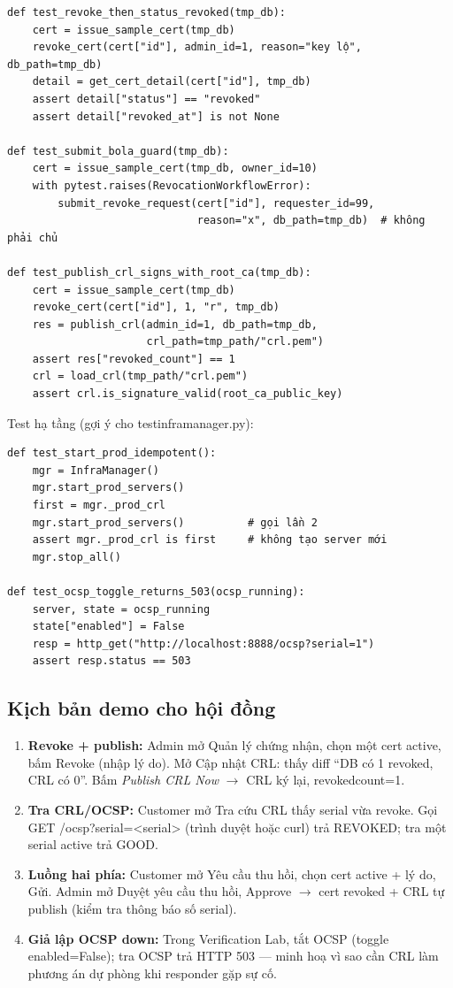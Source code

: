 \documentclass[12pt,a4paper]{article}
\newcommand{\code}[1]{{\ttfamily\small\def\_{\textunderscore\discretionary{}{}{}}#1}}
\begin{document}
\begin{Verbatim}
def test_revoke_then_status_revoked(tmp_db):
    cert = issue_sample_cert(tmp_db)
    revoke_cert(cert["id"], admin_id=1, reason="key lộ", db_path=tmp_db)
    detail = get_cert_detail(cert["id"], tmp_db)
    assert detail["status"] == "revoked"
    assert detail["revoked_at"] is not None

def test_submit_bola_guard(tmp_db):
    cert = issue_sample_cert(tmp_db, owner_id=10)
    with pytest.raises(RevocationWorkflowError):
        submit_revoke_request(cert["id"], requester_id=99,
                              reason="x", db_path=tmp_db)  # không phải chủ

def test_publish_crl_signs_with_root_ca(tmp_db):
    cert = issue_sample_cert(tmp_db)
    revoke_cert(cert["id"], 1, "r", tmp_db)
    res = publish_crl(admin_id=1, db_path=tmp_db,
                      crl_path=tmp_path/"crl.pem")
    assert res["revoked_count"] == 1
    crl = load_crl(tmp_path/"crl.pem")
    assert crl.is_signature_valid(root_ca_public_key)
\end{Verbatim}

Test hạ tầng (gợi ý cho \code{test\_infra\_manager.py}):

\begin{Verbatim}
def test_start_prod_idempotent():
    mgr = InfraManager()
    mgr.start_prod_servers()
    first = mgr._prod_crl
    mgr.start_prod_servers()          # gọi lần 2
    assert mgr._prod_crl is first     # không tạo server mới
    mgr.stop_all()

def test_ocsp_toggle_returns_503(ocsp_running):
    server, state = ocsp_running
    state["enabled"] = False
    resp = http_get("http://localhost:8888/ocsp?serial=1")
    assert resp.status == 503
\end{Verbatim}

\subsection{Kịch bản demo cho hội đồng}

\begin{enumerate}
  \item \textbf{Revoke + publish:} Admin mở Quản lý chứng nhận, chọn một cert
    active, bấm Revoke (nhập lý do). Mở Cập nhật CRL: thấy diff ``DB có 1
    revoked, CRL có 0''. Bấm \emph{Publish CRL Now} $\to$ CRL ký lại,
    \code{revoked\_count}=1.
  \item \textbf{Tra CRL/OCSP:} Customer mở Tra cứu CRL thấy serial vừa revoke.
    Gọi \code{GET /ocsp?serial=<serial>} (trình duyệt hoặc curl) trả
    \code{REVOKED}; tra một serial active trả \code{GOOD}.
  \item \textbf{Luồng hai phía:} Customer mở Yêu cầu thu hồi, chọn cert active +
    lý do, Gửi. Admin mở Duyệt yêu cầu thu hồi, Approve $\to$ cert revoked + CRL
    tự publish (kiểm tra thông báo số serial).
  \item \textbf{Giả lập OCSP down:} Trong Verification Lab, tắt OCSP (toggle
    \code{enabled=False}); tra OCSP trả HTTP 503 --- minh hoạ vì sao cần CRL làm
    phương án dự phòng khi responder gặp sự cố.
\end{enumerate}
\end{document}
